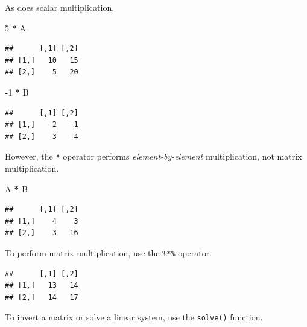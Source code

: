 \documentclass[12pt,oneside,openany]{book}
\newenvironment{Shaded}{\begin{snugshade}}{\end{snugshade}}
\newcommand{\DecValTok}[1]{\textcolor[rgb]{0.00,0.00,0.81}{#1}}
\newcommand{\StringTok}[1]{\textcolor[rgb]{0.31,0.60,0.02}{#1}}
\newcommand{\OperatorTok}[1]{\textcolor[rgb]{0.81,0.36,0.00}{\textbf{#1}}}
\newcommand{\NormalTok}[1]{#1}
\begin{document}
As does scalar multiplication.

\begin{Shaded}
\begin{Highlighting}[]
\DecValTok{5} \OperatorTok{*}\StringTok{ }\NormalTok{A}
\end{Highlighting}
\end{Shaded}

\begin{verbatim}
##      [,1] [,2]
## [1,]   10   15
## [2,]    5   20
\end{verbatim}

\begin{Shaded}
\begin{Highlighting}[]
\OperatorTok{-}\DecValTok{1} \OperatorTok{*}\StringTok{ }\NormalTok{B}
\end{Highlighting}
\end{Shaded}

\begin{verbatim}
##      [,1] [,2]
## [1,]   -2   -1
## [2,]   -3   -4
\end{verbatim}

However, the \texttt{*} operator performs \emph{element-by-element}
multiplication, not matrix multiplication.

\begin{Shaded}
\begin{Highlighting}[]
\NormalTok{A }\OperatorTok{*}\StringTok{ }\NormalTok{B}
\end{Highlighting}
\end{Shaded}

\begin{verbatim}
##      [,1] [,2]
## [1,]    4    3
## [2,]    3   16
\end{verbatim}

To perform matrix multiplication, use the \texttt{\%*\%} operator.

\begin{Shaded}
\end{Shaded}

\begin{verbatim}
##      [,1] [,2]
## [1,]   13   14
## [2,]   14   17
\end{verbatim}

To invert a matrix or solve a linear system, use the \texttt{solve()}
function.
\end{document}
